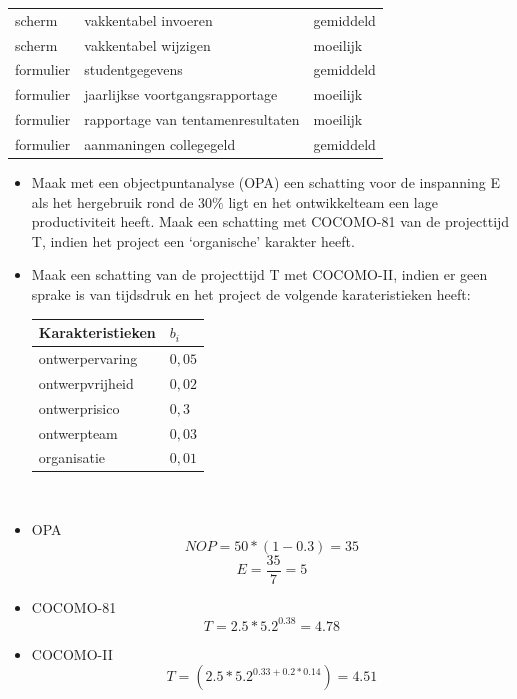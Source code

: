 \documentclass[a4paper,titlepage]{artikel1}
\begin{document}
{\begin{center}
\begin{tabular}[t]{|ll|l|}
     scherm & vakkentabel invoeren & gemiddeld \\
     scherm & vakkentabel wijzigen & moeilijk \\
     formulier & studentgegevens & gemiddeld \\
     formulier & jaarlijkse voortgangsrapportage & moeilijk \\
     formulier & rapportage van tentamenresultaten & moeilijk \\
     formulier & aanmaningen collegegeld & gemiddeld \\
     \hline
   \end{tabular}
   \end{center}
   \begin{itemize}
     \item Maak met een objectpuntanalyse (OPA) een schatting voor de inspanning E als het hergebruik rond de $30\%$ ligt en het ontwikkelteam een lage productiviteit heeft. Maak een schatting met COCOMO-81 van de projecttijd T, indien het project een `organische' karakter heeft.
     \item Maak een schatting van de projecttijd T met COCOMO-II, indien er geen sprake is van tijdsdruk en het project de volgende karateristieken heeft:\\
       \begin{center}
       \begin{tabular}[]{|l|l|}
         \hline
         Karakteristieken & $b_i$ \\
         \hline
         ontwerpervaring & $0,05$ \\
         ontwerpvrijheid & $0,02$ \\
         ontwerprisico & $0,3$ \\
         ontwerpteam & $0,03$ \\
         organisatie & $0,01$ \\
         \hline
       \end{tabular}
       \\
       \end{center}
   \end{itemize}
   }
   \begin{itemize}
    \item OPA
	  \begin{displaymath}
	   NOP=50*(1-0.3)=35
	  \end{displaymath} 
	  \begin{displaymath}
	   E=\frac{35}{7}=5
	  \end{displaymath}
    \item COCOMO-81
	  \begin{displaymath}
	   T=2.5*5.2^{0.38}=4.78
	  \end{displaymath}
    \item COCOMO-II
	  \begin{displaymath}
	   T=(2.5*5.2^{0.33+0.2*0.14})=4.51
	  \end{displaymath}
   \end{itemize}
\end{document}
